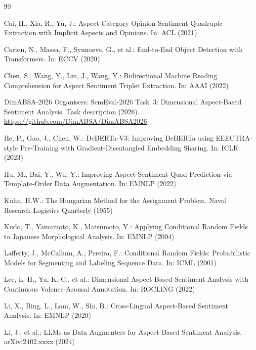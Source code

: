 \documentclass[runningheads]{llncs}
\begin{document}


\begin{thebibliography}{99}\small

Cai, H., Xia, R., Yu, J.: Aspect-Category-Opinion-Sentiment Quadruple
Extraction with Implicit Aspects and Opinions. In: ACL (2021)

Carion, N., Massa, F., Synnaeve, G., et al.: End-to-End Object
Detection with Transformers. In: ECCV (2020)

Chen, S., Wang, Y., Liu, J., Wang, Y.: Bidirectional Machine Reading
Comprehension for Aspect Sentiment Triplet Extraction. In: AAAI (2022)

DimABSA-2026 Organisers: SemEval-2026 Task~3: Dimensional
Aspect-Based Sentiment Analysis. Task description (2026).
\url{https://github.com/DimABSA/DimABSA2026}

He, P., Gao, J., Chen, W.: DeBERTa-V3: Improving DeBERTa using
ELECTRA-style Pre-Training with Gradient-Disentangled Embedding
Sharing. In: ICLR (2023)

Hu, M., Bai, Y., Wu, Y.: Improving Aspect Sentiment Quad Prediction
via Template-Order Data Augmentation. In: EMNLP (2022)

Kuhn, H.W.: The Hungarian Method for the Assignment Problem. Naval
Research Logistics Quarterly (1955)

Kudo, T., Yamamoto, K., Matsumoto, Y.: Applying Conditional Random
Fields to Japanese Morphological Analysis. In: EMNLP (2004)

Lafferty, J., McCallum, A., Pereira, F.: Conditional Random Fields:
Probabilistic Models for Segmenting and Labeling Sequence Data. In:
ICML (2001)

Lee, L.-H., Yu, K.-C., et al.: Dimensional Aspect-Based Sentiment
Analysis with Continuous Valence-Arousal Annotation. In: ROCLING
(2022)

Li, X., Bing, L., Lam, W., Shi, B.: Cross-Lingual Aspect-Based
Sentiment Analysis. In: EMNLP (2020)

Li, J., et al.: LLMs as Data Augmenters for Aspect-Based Sentiment
Analysis. arXiv:2402.xxxx (2024)


\end{thebibliography}
\end{document}
